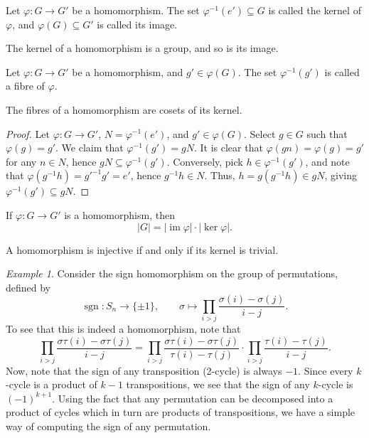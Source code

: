 \documentclass[11pt]{article}
\newcommand{\im}{\operatorname{im}}
\newcommand{\sign}{\operatorname{sgn}}
\theoremstyle{definition}
\theoremstyle{remark}
\newtheorem*{example}{Example}
\numberwithin{equation}{section}
\begin{document}
    \begin{definition}
        Let $\varphi\colon G \to G'$ be a homomorphism. The set $\varphi^{-1}(e')
        \subseteq G$ is called the kernel of $\varphi$, and $\varphi(G) \subseteq G'$
        is called its image.
    \end{definition}
    \begin{lemma}
        The kernel of a homomorphism is a group, and so is its image.
    \end{lemma}

    \begin{definition}
        Let $\varphi\colon G \to G'$ be a homomorphism, and $g' \in \varphi(G)$. The
        set $\varphi^{-1}(g')$ is called a fibre of $\varphi$.
    \end{definition}
    \begin{lemma}
        The fibres of a homomorphism are cosets of its kernel.
    \end{lemma}
    \begin{proof}
        Let $\varphi\colon G \to G'$, $N = \varphi^{-1}(e')$, and $g' \in
        \varphi(G)$. Select $g \in G$ such that $\varphi(g) = g'$. We claim that
        $\varphi^{-1}(g') = gN$. It is clear that $\varphi(gn) = \varphi(g) = g'$ for
        any $n \in N$, hence $gN \subseteq \varphi^{-1}(g')$. Conversely, pick $h \in
        \varphi^{-1}(g')$, and note that $\varphi(g^{-1}h) = g'^{-1}g' = e'$, hence
        $g^{-1}h \in N$. Thus, $h = g(g^{-1}h) \in gN$, giving $\varphi^{-1}(g')
        \subseteq gN$.
    \end{proof}
    \begin{corollary}
        If $\varphi\colon G \to G'$ is a homomorphism, then \[
            |G| = |\im{\varphi}|\cdot|\ker{\varphi}|.
        \] 
    \end{corollary}
    \begin{corollary}
        A homomorphism is injective if and only if its kernel is trivial.
    \end{corollary}

    \begin{example}
        Consider the sign homomorphism on the group of permutations, defined by \[
            \sign\colon S_n \to \{\pm 1\}, \qquad \sigma \mapsto \prod_{i > j}
            \frac{\sigma(i) - \sigma(j)}{i - j}.
        \] To see that this is indeed a homomorphism, note that \[
            \prod_{i > j} \frac{\sigma\tau(i) - \sigma\tau(j)}{i - j} = 
            \prod_{i > j} \frac{\sigma\tau(i) - \sigma\tau(j)}{\tau(i) - \tau(j)}
            \cdot \prod_{i > j} \frac{\tau(i) - \tau(j)}{i - j}.
        \] Now, note that the sign of any transposition (2-cycle) is always $-1$.
        Since every $k$-cycle is a product of $k - 1$ transpositions, we see that the
        sign of any $k$-cycle is $(-1)^{k + 1}$. Using the fact that any permutation
        can be decomposed into a product of cycles which in turn are products of
        transpositions, we have a simple way of computing the sign of any permutation.
    \end{example}
\end{document}
